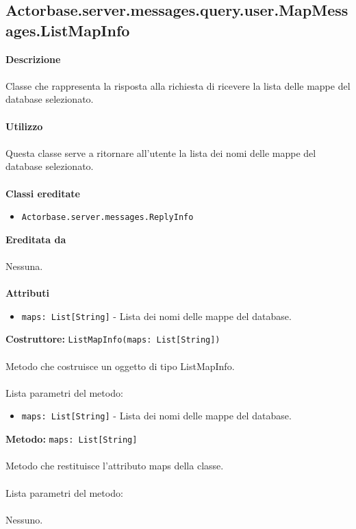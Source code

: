 \documentclass[a4paper]{article}
\begin{document}
	\subsection{Actorbase.server.messages.query.user.MapMessages.ListMapInfo}
		\textbf{Descrizione}
			\\ \\
		Classe che rappresenta la risposta alla richiesta di ricevere la lista delle mappe del database selezionato.
			\\ \\
		\textbf{Utilizzo}
			\\ \\
		Questa classe serve a ritornare all'utente la lista dei nomi delle mappe del database selezionato.
			\\ \\
		\textbf{Classi ereditate}
			\begin{itemize}
				\item \texttt{Actorbase.server.messages.ReplyInfo }
			\end{itemize}
		\textbf{Ereditata da}
			\\ \\
			Nessuna.
			\\ \\
		\textbf{Attributi}
			\begin{itemize}
				\item \texttt{maps: List[String]} - Lista dei nomi delle mappe del database.
			\end{itemize}
		\textbf{Costruttore: }\texttt{ListMapInfo(maps: List[String])}
			\\ \\
		Metodo che costruisce un oggetto di tipo ListMapInfo.
			\\ \\
		Lista parametri del metodo:
			\begin{itemize}
				\item \texttt{maps: List[String]} - Lista dei nomi delle mappe del database.
			\end{itemize}
		\textbf{Metodo: }\texttt{maps: List[String]}
			\\ \\
		Metodo che restituisce l'attributo maps della classe.
			\\ \\
		Lista parametri del metodo:
			\\ \\
			Nessuno.
			
\end{document}
